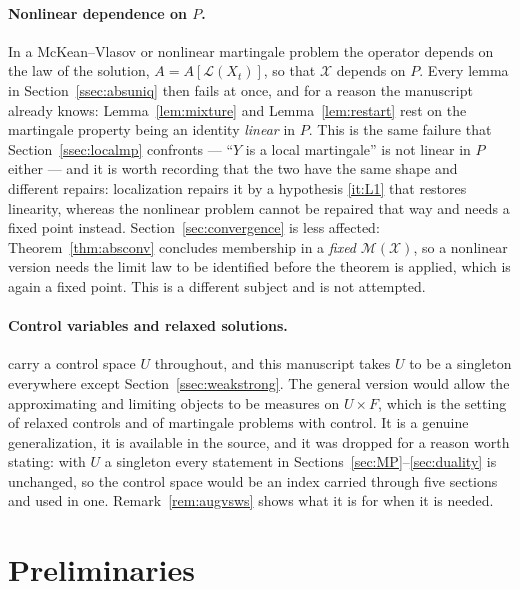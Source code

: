 \documentclass[11pt,a4paper]{article}
\theoremstyle{plain}
\theoremstyle{definition}
\theoremstyle{remark}
\newcommand{\XX}{\mathcal{X}}                  %
\newcommand{\Msol}{\mathcal{M}}
\newcommand{\CPS}{\cite{CPS23}}
\begin{document}
\paragraph{Nonlinear dependence on $P$.}
In a McKean--Vlasov or nonlinear martingale problem the operator depends on the
law of the solution, $A = A[\mathcal{L}(X_t)]$, so that $\XX$ depends on $P$.
Every lemma in Section~\ref{ssec:absuniq} then fails at once, and for a reason
the manuscript already knows: Lemma~\ref{lem:mixture} and
Lemma~\ref{lem:restart} rest on the martingale property being an identity
\emph{linear} in $P$.  This is the same failure that
Section~\ref{ssec:localmp} confronts --- ``$Y$ is a local martingale'' is not
linear in $P$ either --- and it is worth recording that the two have the same
shape and different repairs: localization repairs it by a hypothesis \ref{it:L1}
that restores linearity, whereas the nonlinear problem cannot be repaired that
way and needs a fixed point instead.  Section~\ref{sec:convergence} is less
affected: Theorem~\ref{thm:absconv} concludes membership in a \emph{fixed}
$\Msol(\XX)$, so a nonlinear version needs the limit law to be identified before
the theorem is applied, which is again a fixed point.  This is a different
subject and is not attempted.

\paragraph{Control variables and relaxed solutions.}
\CPS{} carry a control space $U$ throughout, and this manuscript takes $U$ to be
a singleton everywhere except Section~\ref{ssec:weakstrong}.  The general version
would allow the approximating and limiting objects to be measures on
$U \times F$, which is the setting of relaxed controls and of martingale problems
with control.  It is a genuine generalization, it is available in the source, and
it was dropped for a reason worth stating: with $U$ a singleton every statement
in Sections~\ref{sec:MP}--\ref{sec:duality} is unchanged, so the control space
would be an index carried through five sections and used in one.
Remark~\ref{rem:augvsws} shows what it is for when it is needed.

\section{Preliminaries}
\label{sec:notation}
\end{document}
